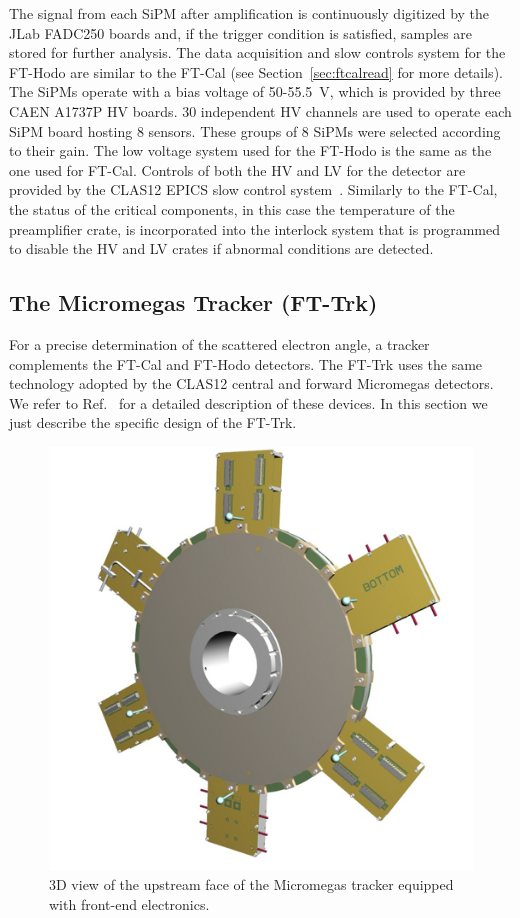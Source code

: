 The signal from each SiPM after amplification is continuously digitized by the JLab FADC250 boards and, if the
trigger condition is satisfied, samples are stored for further analysis. The data acquisition and slow controls system
for the FT-Hodo are similar to the FT-Cal (see Section~\ref{sec:ftcalread} for more details). The SiPMs operate
with a bias voltage of 50-55.5~V, which is provided by three CAEN A1737P HV boards. 30 independent HV channels
are used to operate each SiPM board hosting 8 sensors. These groups of 8 SiPMs were selected according to their
gain. The low voltage system used for the FT-Hodo is the same as the one used for FT-Cal. Controls of both the HV
and LV for the detector are provided by the CLAS12 EPICS slow control system~\cite{daq}. Similarly to the FT-Cal,
the status of the critical components, in this case the temperature of the preamplifier crate, is incorporated into
the interlock system that is programmed to disable the HV and LV crates if abnormal conditions are detected.

\subsection{The Micromegas Tracker (FT-Trk)}

For a precise determination of the scattered electron angle, a tracker complements the FT-Cal and FT-Hodo
detectors. The FT-Trk uses the same technology adopted by the CLAS12 central and forward Micromegas
detectors. We refer to Ref.~\cite{mm} for a detailed description of  these devices. In this section we just
describe the specific design of the FT-Trk.

\begin{figure}[th!]
\centering 
\includegraphics[width=1.0\columnwidth]{./fig/fttrk_layout.png}
\caption{3D view of the upstream face of the Micromegas tracker equipped with front-end electronics.}
\label{fig:ft-trck} 
\end{figure}

